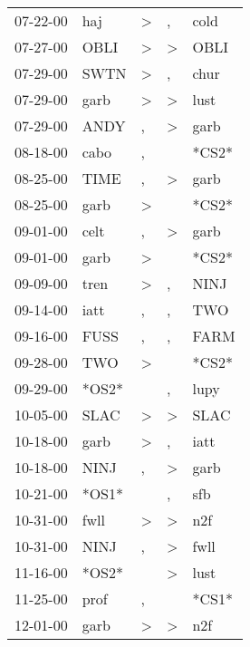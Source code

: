 \begin{supertabular}{lllll}
 07-22-00 &    haj &     \textgreater &                , &   cold \\
 07-27-00 &   OBLI &     \textgreater &     \textgreater &   OBLI \\
 07-29-00 &   SWTN &     \textgreater &                , &   chur \\
 07-29-00 &   garb &     \textgreater &     \textgreater &   lust \\
 07-29-00 &   ANDY &                , &     \textgreater &   garb \\
 08-18-00 &   cabo &                , &                  &  *CS2* \\
 08-25-00 &   TIME &                , &     \textgreater &   garb \\
 08-25-00 &   garb &     \textgreater &                  &  *CS2* \\
 09-01-00 &   celt &                , &     \textgreater &   garb \\
 09-01-00 &   garb &     \textgreater &                  &  *CS2* \\
 09-09-00 &   tren &     \textgreater &                , &   NINJ \\
 09-14-00 &   iatt &                , &                , &    TWO \\
 09-16-00 &   FUSS &                , &                , &   FARM \\
 09-28-00 &    TWO &     \textgreater &                  &  *CS2* \\
 09-29-00 &  *OS2* &                  &                , &   lupy \\
 10-05-00 &   SLAC &     \textgreater &     \textgreater &   SLAC \\
 10-18-00 &   garb &     \textgreater &                , &   iatt \\
 10-18-00 &   NINJ &                , &     \textgreater &   garb \\
 10-21-00 &  *OS1* &                  &                , &    sfb \\
 10-31-00 &   fwll &     \textgreater &     \textgreater &    n2f \\
 10-31-00 &   NINJ &                , &     \textgreater &   fwll \\
 11-16-00 &  *OS2* &                  &     \textgreater &   lust \\
 11-25-00 &   prof &                , &                  &  *CS1* \\
 12-01-00 &   garb &     \textgreater &     \textgreater &    n2f \\

\end{supertabular}
